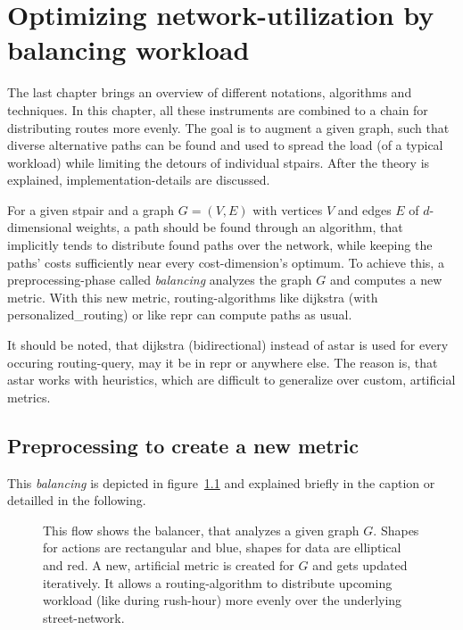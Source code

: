 \chapter{Optimizing network-utilization by balancing workload}
\label{chap:balancing}

The last chapter brings an overview of different notations, algorithms and techniques.
In this chapter, all these instruments are combined to a chain for distributing routes more evenly.
The goal is to augment a given graph, such that diverse alternative paths can be found and used to spread the load (of a typical workload) while limiting the detours of individual \glspl{stpair}.
After the theory is explained, implementation-details are discussed.

For a given \gls{stpair} and a graph $G = (V, E)$ with vertices $V$ and edges $E$ of $d$-dimensional \glspl{weight}, a path should be found through an algorithm, that implicitly tends to distribute found paths over the network, while keeping the paths' \glspl{cost} sufficiently near every \gls{cost}-dimension's optimum.
To achieve this, a preprocessing-phase called \textit{balancing} analyzes the graph $G$ and computes a new \gls{metric}.
With this new \gls{metric}, routing-algorithms like \gls{dijkstra}  (with \gls{personalized_routing}) or like \gls{repr} can compute paths as usual.

It should be noted, that \gls{dijkstra} (bidirectional) instead of \gls{astar} is used for every occuring routing-query, may it be in \gls{repr} or anywhere else.
The reason is, that \gls{astar} works with heuristics, which are difficult to generalize over custom, artificial metrics.

\section{Preprocessing to create a new metric}


    This \textit{balancing} is depicted in figure~\ref{fig:balancing} and explained briefly in the caption or detailled in the following.

    \begin{figure}
        \centering
        
        \caption[Overview of balancing a graph]{%
            This flow shows the balancer, that analyzes a given graph $G$.
            Shapes for actions are rectangular and blue, shapes for data are elliptical and red.
            A new, artificial \gls{metric} is created for $G$ and gets updated iteratively.
            It allows a routing-algorithm to distribute upcoming workload (like during rush-hour) more evenly over the underlying street-network.
            \label{fig:balancing}
        }
    \end{figure}

